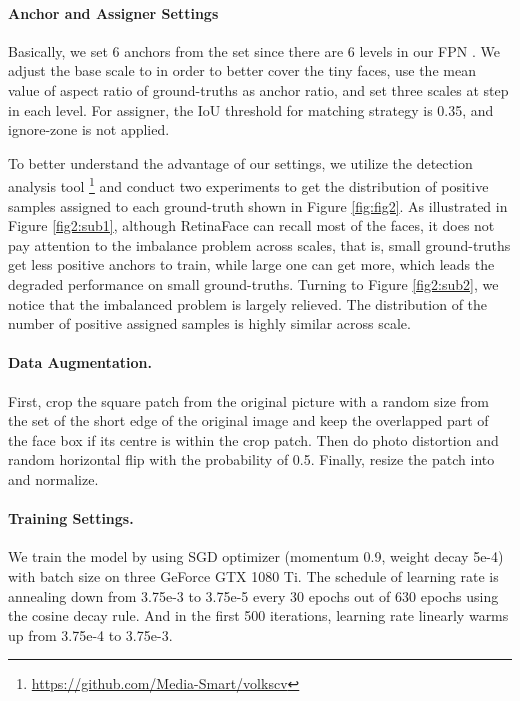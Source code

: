 \documentclass[final]{cvpr}
\begin{document}
\paragraph{Anchor and Assigner Settings}
Basically, we set 6 anchors from the set  since there are 6 levels in our FPN \cite{lin2017feature}. We adjust the base scale to  in order to better cover the tiny faces, use the mean value of aspect ratio of ground-truths as anchor ratio, and set three scales at step  in each level. For assigner, the IoU threshold for matching strategy is 0.35, and ignore-zone is not applied.

To better understand the advantage of our settings, we utilize the detection analysis tool \footnote{\url{https://github.com/Media-Smart/volkscv}} and conduct two experiments to get the distribution of positive samples assigned to each ground-truth shown in Figure \ref{fig:fig2}. As illustrated in Figure \ref{fig2:sub1}, although RetinaFace \cite{deng2019retinaface} can recall most of the faces, it does not pay attention to the imbalance problem across scales, that is, small ground-truths get less positive anchors to train, while large one can get more, which leads the degraded performance on small ground-truths. Turning to Figure \ref{fig2:sub2}, we notice that the imbalanced problem is largely relieved. The distribution of the number of positive assigned samples is highly similar across scale.


\paragraph{Data Augmentation.}
First, crop the square patch from the original picture with a random size from the set  of the short edge of the original image and keep the overlapped part of the face box if its centre is within the crop patch. Then do photo distortion and random horizontal flip with the probability of 0.5. Finally, resize the patch into  and normalize.

\paragraph{Training Settings.}
We train the model by using SGD optimizer (momentum 0.9, weight decay 5e-4) with batch size  on three GeForce GTX 1080 Ti. The schedule of learning rate is annealing down from 3.75e-3 to 3.75e-5 every 30 epochs out of 630 epochs using the cosine decay rule. And in the first 500 iterations, learning rate linearly warms up from 3.75e-4 to 3.75e-3.
\end{document}
